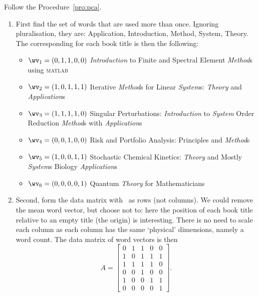 Follow the  Procedure~\ref{pro:pca}.
\begin{enumerate}
\item 
First find the set of words that are used more than once.
Ignoring pluralisation, they are: 
Application, Introduction, Method, System, Theory.
The corresponding  for each book title is then the following:
\begin{itemize}
\item \(\wv_1=(0,1,1,0,0)\) \emph{Introduction} to Finite and Spectral Element \emph{Method}s using \textsc{matlab}
\item \(\wv_2=(1,0,1,1,1)\) Iterative \emph{Method}s for Linear \emph{System}s: \emph{Theory} and \emph{Application}s 
\item \(\wv_3=(1,1,1,1,0)\) Singular Perturbations: \emph{Introduction} to \emph{System} Order Reduction \emph{Method}s with \emph{Application}s 
\item \(\wv_4=(0,0,1,0,0)\) Risk and Portfolio Analysis: Principles and \emph{Method}s 
\item \(\wv_5=(1,0,0,1,1)\) Stochastic Chemical Kinetics: \emph{Theory} and Mostly \emph{System}s Biology \emph{Application}s
\item \(\wv_6=(0,0,0,0,1)\) Quantum \emph{Theory} for Mathematicians 
\end{itemize}

\item Second, form the data matrix with \hlist{}\ as rows (not columns).
We could remove the mean word vector, but choose not to: here the position of each book title relative to an empty title (the origin) is interesting.
There is no need to scale each column as each column has the same `physical' dimensions, namely a word count.
The data matrix of word vectors is then
\begin{equation*}
A=\begin{bmatrix} 0&1&1&0&0
\\1&0&1&1&1
\\1&1&1&1&0
\\0&0&1&0&0
\\1&0&0&1&1
\\0&0&0&0&1 \end{bmatrix}.
\end{equation*}
\setbox\ajrqrbox\hbox{}%
\marginpar{\usebox{\ajrqrbox\\[2ex]}}%



\end{enumerate}
